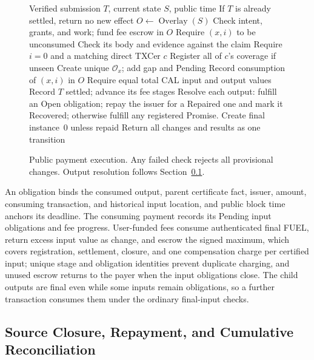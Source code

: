 \begin{figure}[t]
  \small
  \begin{algorithmic}[1]
    \REQUIRE Verified submission $T$, current state $S$, public time
    \STATE If $T$ is already settled, return no new effect
    \STATE $O\gets\operatorname{Overlay}(S)$
    \STATE Check intent, grants, and work; fund fee escrow in $O$
      \STATE Require $(x,i)$ to be unconsumed
        \STATE Check its body and evidence against the claim
      \ELSE
        \STATE Require $i=0$ and a matching direct TXCer $c$
        \STATE Register all of $c$'s coverage if unseen
        \STATE Create unique $\mathcal{O}_x$; add gap and Pending
      \ENDIF
      \STATE Record consumption of $(x,i)$ in $O$
    \ENDFOR
    \STATE Require equal total CAL input and output values
    \STATE Record $T$ settled; advance its fee stages
    \STATE Resolve each output: fulfill an Open obligation; repay the
    issuer for a Repaired one and mark it Recovered; otherwise fulfill
    any registered Promise. Create final instance~0 unless repaid
    \STATE Return all changes and results as one transition
  \end{algorithmic}
  \caption{Public payment execution. Any failed check rejects all
    provisional changes. Output resolution follows
    Section~\ref{sec:protocol-closure}.}
  \label{fig:protocol-payment}
\end{figure}

An obligation binds the consumed output, parent certificate fact, issuer, amount, consuming transaction, and historical input location, and public block time anchors its deadline. The consuming payment records its Pending input obligations and fee progress. User-funded fees consume authenticated final FUEL, return excess input value as change, and escrow the signed maximum, which covers registration, settlement, closure, and one compensation charge per certified input; unique stage and obligation identities prevent duplicate charging, and unused escrow returns to the payer when the input obligations close. The child outputs are final even while some inputs remain obligations, so a further transaction consumes them under the ordinary final-input checks.

\subsection{Source Closure, Repayment, and Cumulative Reconciliation}
\label{sec:protocol-closure}

